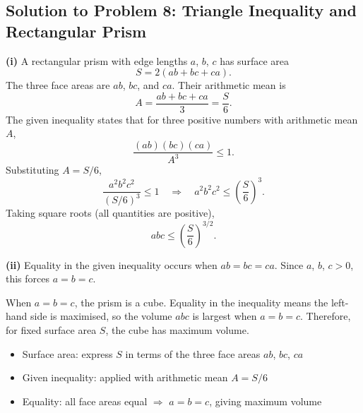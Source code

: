 \subsection{Solution to Problem 8: Triangle Inequality and Rectangular Prism}

\begin{solution}
\textbf{(i)} A rectangular prism with edge lengths $a$, $b$, $c$ has surface area
\[
S = 2(ab + bc + ca).
\]
The three face areas are $ab$, $bc$, and $ca$. Their arithmetic mean is
\[
A = \frac{ab + bc + ca}{3} = \frac{S}{6}.
\]
The given inequality states that for three positive numbers with arithmetic mean $A$,
\[
\frac{(ab)(bc)(ca)}{A^3} \le 1.
\]
Substituting $A = S/6$,
\[
\frac{a^2b^2c^2}{(S/6)^3} \le 1
\quad\Longrightarrow\quad
a^2b^2c^2 \le \left(\frac{S}{6}\right)^3.
\]
Taking square roots (all quantities are positive),
\[
abc \le \left(\frac{S}{6}\right)^{3/2}.
\]

\textbf{(ii)} Equality in the given inequality occurs when $ab = bc = ca$. Since $a$, $b$, $c > 0$, this forces $a = b = c$.

When $a = b = c$, the prism is a cube. Equality in the inequality means the left-hand side is maximised, so the volume $abc$ is largest when $a = b = c$. Therefore, for fixed surface area $S$, the cube has maximum volume.
\end{solution}

\begin{takeaways}
\begin{itemize}
    \item Surface area: express $S$ in terms of the three face areas $ab$, $bc$, $ca$
    \item Given inequality: applied with arithmetic mean $A = S/6$
    \item Equality: all face areas equal $\Longrightarrow$ $a=b=c$, giving maximum volume
\end{itemize}
\end{takeaways}
